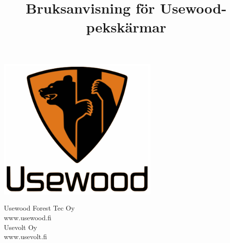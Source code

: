 \documentclass[12pt,a4paper,finnish]{uvmanual}
\title{Bruksanvisning för Usewood-pekskärmar}
\begin{document}
%	
\thispagestyle{empty}
\vspace*{-1cm}\noindent
\begin{center}
\includegraphics[width=8cm]{img/uw_logo_color.png}   %
\end{center}
\vspace{1cm}
\begin{center}
\end{center}



\vspace{2.8cm}
\maketitle
\vspace{2.8cm}


\begin{minipage}[c]{8.8cm}
  \begin{spacing}{1.0}
    \textsf{Usewood Forest Tec Oy}\\
    \textsf{www.usewood.fi}\\
    \textsf{Usevolt Oy}\\
    \textsf{www.usevolt.fi}\\
  \end{spacing}
\end{minipage}

\if@twoside
\clearpage
\fi

\setcounter{page}{0} %
\end{document}
